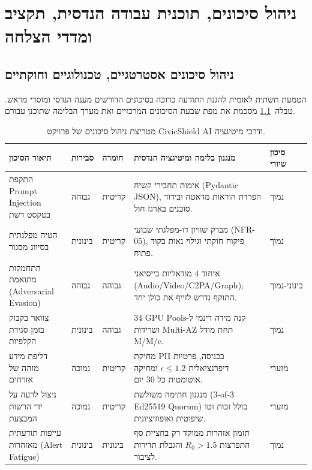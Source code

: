 \chapter{ניהול סיכונים, תוכנית עבודה הנדסית, תקציב ומדדי הצלחה}
\label{ch:roadmap}

\section{ניהול סיכונים אסטרטגיים, טכנולוגיים וחוקתיים}
\label{sec:risks}
הטמעת תשתית לאומית להגנת התודעה כרוכה בסיכונים הדורשים מענה הנדסי ומוסדי מראש. טבלה~\ref{tab:risks} מסכמת את מפת שבעת הסיכונים המרכזיים ואת מערך הבלימה שתוכנן עבורם.

\begin{table}[htbp]
    \centering
    \caption{מטריצת ניהול סיכונים של פרויקט \textenglish{CivicShield AI} ודרכי מיטיגציה.}
    \label{tab:risks}
    \begin{tabular}{p{} p{} p{} p{} p{}}
        \hline
        \textbf{תיאור הסיכון} & \textbf{סבירות} & \textbf{חומרה} & \textbf{מנגנון בלימה ומיטיגציה הנדסית} & \textbf{סיכון שיורי} \\
        \hline
        התקפת \textenglish{Prompt Injection} בטקסט רשת & גבוהה & קריטית & אימות תחבירי קשיח (\textenglish{Pydantic JSON}), הפרדת הוראות מדאטה ובידוד סוכנים בארגז חול. & נמוך \\
        הטיה מפלגתית בסיווג מסגור & בינונית & קריטית & מבדק שוויון דו-מפלגתי שבועי (\textenglish{NFR-05}), פיקוח חוקתי וגילוי נאות בקוד פתוח. & נמוך \\
        התחמקות מתואמת (\textenglish{Adversarial Evasion}) & גבוהה & גבוהה & איחוד $4$ מודאליות בייסיאני (\textenglish{Audio/Video/C2PA/Graph}); התוקף נדרש לזייף את כולן יחד. & בינוני-נמוך \\
        צוואר בקבוק בזמן סגירת הקלפיות & בינונית & גבוהה & קנה מידה דינמי ל-$34\text{ GPU Pools}$ ושרידות \textenglish{Multi-AZ} תחת מודל \textenglish{M/M/c}. & נמוך \\
        דליפת מידע מזהה של אזרחים & נמוכה & קריטית & מחיקת \textenglish{PII} בכניסה, פרטיות דיפרנציאלית $\epsilon \le 1.2$ ומחיקה אוטומטית כל $30$ יום. & מזערי \\
        ניצול לרעה על ידי הרשות המבצעת & נמוכה & קריטית & מנגנון חתימה משולשת (\textenglish{3-of-3 Ed25519 Quorum}) כולל זכות וטו שיפוטית ואופוזיציונית. & מזערי \\
        עייפות תודעתית מאזהרות (\textenglish{Alert Fatigue}) & בינונית & בינונית & תזמון אזהרות ממוקד רק בחציית סף התפרצות $R_0 > 1.5$ והגבלת תדירות לציבור. & נמוך \\
        \hline
    \end{tabular}
\end{table}

